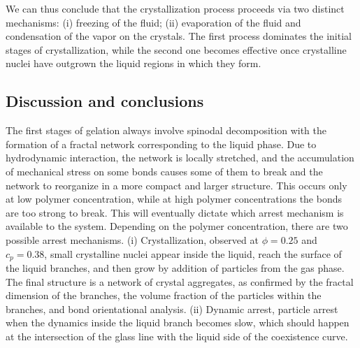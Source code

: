 \documentclass[twocolumn,superscriptaddress,showpacs,preprintnumbers,
amsmath,amssymb,prl]{revtex4-1}
\begin{document}
We can thus conclude that the crystallization process proceeds via two distinct mechanisms:
(i) freezing of the fluid; (ii) evaporation of the fluid and condensation of the vapor on the crystals.
The first process dominates the initial stages of crystallization, while the second one becomes effective once
crystalline nuclei have outgrown the liquid regions in which they form. 
% 

\subsection*{Discussion and conclusions}
The first stages of gelation always involve spinodal decomposition with the formation
of a fractal network corresponding to the liquid phase.
Due to hydrodynamic interaction, the network is locally stretched, and the accumulation of mechanical stress on some bonds causes some
of them to break and the network to reorganize in a more compact and larger structure. This occurs only at low polymer concentration,
while at high polymer concentrations the bonds are too strong to break. This will eventually dictate which arrest mechanism
is available to the system.
Depending on the polymer concentration, there are two possible arrest mechanisms.
(i) Crystallization, observed at $\phi=0.25$ and $c_p=0.38$, small crystalline nuclei appear inside the liquid, reach the surface
 of the liquid branches, and then grow by addition of particles from the gas phase. The final structure is a network of crystal aggregates,
 as confirmed by the fractal dimension of the branches, the volume fraction of the particles within the branches, and bond orientational analysis.
(ii) Dynamic arrest, particle arrest when the dynamics inside the liquid branch becomes slow, which should happen at the intersection of the
 glass line with the liquid side of the coexistence curve.
\end{document}
